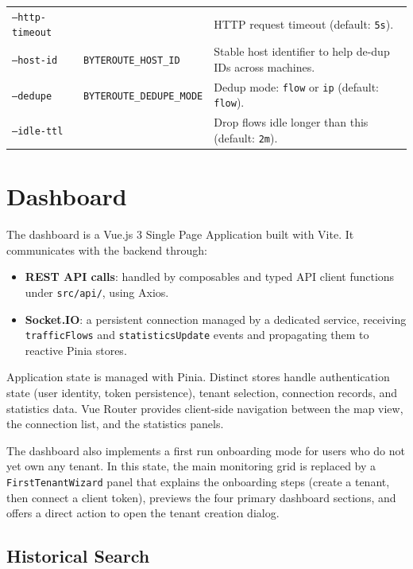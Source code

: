 \documentclass[12pt]{report}
\begin{document}
\begin{table}[htbp]
\begin{tabularx}{\textwidth}{p{}p{}X}
    \texttt{--http-timeout} & & HTTP request timeout (default: \texttt{5s}). \\
    \texttt{--host-id} & \texttt{BYTEROUTE\_HOST\_ID} &
      Stable host identifier to help de-dup IDs across machines. \\
    \texttt{--dedupe} & \texttt{BYTEROUTE\_DEDUPE\_MODE} &
      Dedup mode: \texttt{flow} or \texttt{ip} (default: \texttt{flow}). \\
    \texttt{--idle-ttl} & & Drop flows idle longer than this (default: \texttt{2m}). \\
    \bottomrule
  \end{tabularx}
\end{table}

\newpage
\section{Dashboard}

The dashboard is a Vue.js 3 Single Page Application built with Vite. It
communicates with the backend through:

\begin{itemize}
  \item \textbf{REST API calls}: handled by composables and typed API client
    functions under \texttt{src/api/}, using Axios.
  \item \textbf{Socket.IO}: a persistent connection managed by a dedicated
    service, receiving \texttt{trafficFlows} and \texttt{statisticsUpdate}
    events and propagating them to reactive Pinia stores.
\end{itemize}

Application state is managed with Pinia. Distinct stores handle
authentication state (user identity, token persistence), tenant selection,
connection records, and statistics data. Vue Router provides client-side
navigation between the map view, the connection list, and the statistics panels.

The dashboard also implements a first run onboarding mode for users who do not yet
own any tenant. In this state, the main monitoring grid is replaced by a
\texttt{FirstTenantWizard} panel that explains the onboarding steps (create a tenant,
then connect a client token), previews the four primary dashboard sections, and
offers a direct action to open the tenant creation dialog.

\subsection{Historical Search}
\end{document}

